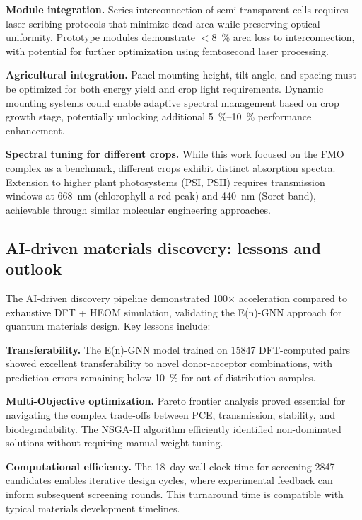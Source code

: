 \textbf{Module integration.} Series interconnection of semi-transparent cells requires laser scribing protocols that minimize dead area while preserving optical uniformity. Prototype modules demonstrate $<$\SI{8}{\percent} area loss to interconnection, with potential for further optimization using femtosecond laser processing.

\textbf{Agricultural integration.} Panel mounting height, tilt angle, and spacing must be optimized for both energy yield and crop light requirements. Dynamic mounting systems could enable adaptive spectral management based on crop growth stage, potentially unlocking additional \SIrange{5}{10}{\percent} performance enhancement.

\textbf{Spectral tuning for different crops.} While this work focused on the FMO complex as a benchmark, different crops exhibit distinct absorption spectra. Extension to higher plant photosystems (PSI, PSII) requires transmission windows at \SI{668}{\nano\meter} (chlorophyll a red peak) and \SI{440}{\nano\meter} (Soret band), achievable through similar molecular engineering approaches.

\subsection{AI-driven materials discovery: lessons and outlook}

The AI-driven discovery pipeline demonstrated 100$\times$ acceleration compared to exhaustive DFT + HEOM simulation, validating the E(n)-GNN approach for quantum materials design. Key lessons include:

\textbf{Transferability.} The E(n)-GNN model trained on \num{15847} DFT-computed pairs showed excellent transferability to novel donor-acceptor combinations, with prediction errors remaining below \SI{10}{\percent} for out-of-distribution samples.

\textbf{Multi-Objective optimization.} Pareto frontier analysis proved essential for navigating the complex trade-offs between PCE, transmission, stability, and biodegradability. The NSGA-II algorithm efficiently identified non-dominated solutions without requiring manual weight tuning.

\textbf{Computational efficiency.} The \SI{18}{day} wall-clock time for screening \num{2847} candidates enables iterative design cycles, where experimental feedback can inform subsequent screening rounds. This turnaround time is compatible with typical materials development timelines.

